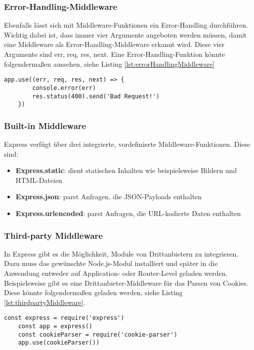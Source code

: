 \subsubsection{Error-Handling-Middleware}

Ebenfalls lässt sich mit Middleware-Funktionen ein Error-Handling durchführen. Wichtig dabei ist, dass immer vier Argumente angeboten werden müssen, damit eine Middleware als Error-Handling-Middleware erkannt wird. Diese vier Argumente sind \grqq err, req, res, next\glqq{}. 
Eine Error-Handling-Funktion könnte folgendermaßen aussehen, siehe Listing \ref*{lst:errorHandlingMiddleware}

\begin{lstlisting}[caption={Error-Handling-Middleware}, label={lst:errorHandlingMiddleware}]
    app.use((err, req, res, next) => {
	    console.error(err)
	    res.status(400).send('Bad Request!')
    })
\end{lstlisting}


\subsubsection{Built-in Middleware}

Express verfügt über drei integrierte, vordefinierte Middleware-Funktionen. Diese sind:
\begin{itemize}
    \item \textbf{Express.static}: dient statischen Inhalten wie beispielsweise Bildern und HTML-Dateien
    \item \textbf{Express.json}: parst Anfragen, die JSON-Payloads enthalten
    \item \textbf{Express.urlencoded}: parst Anfragen, die URL-kodierte Daten enthalten
\end{itemize}

\subsubsection{Third-party Middleware}

In Express gibt es die Möglichkeit, Module von Drittanbietern zu integrieren. Dazu muss das gewünschte Node.js-Modul installiert und später in die Anwendung entweder auf Application- oder Router-Level geladen werden. Beispielsweise gibt es eine Drittanbieter-Middleware für das Parsen von Cookies. Diese könnte folgendermaßen geladen werden, siehe Listing \ref*{lst:thirdpartyMiddleware}.

\begin{lstlisting}[caption={Module von Drittanbietern integrieren \cite{nsechs}}, label={lst:thirdpartyMiddleware}]
    const express = require('express')
    const app = express()
    const cookieParser = require('cookie-parser')
    app.use(cookieParser())
\end{lstlisting}


